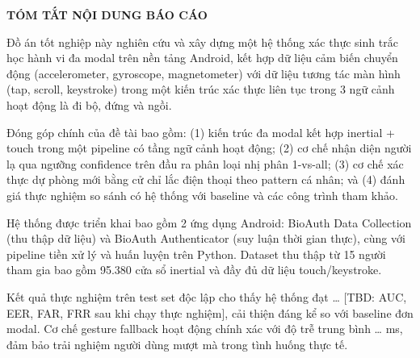 \documentclass[../DoAn.tex]{subfiles}
\begin{document}
    \begin{center}
        \Large{\textbf{TÓM TẮT NỘI DUNG BÁO CÁO}}\\
    \end{center}
    \vspace{1cm}

    Đồ án tốt nghiệp này nghiên cứu và xây dựng một hệ thống xác thực sinh trắc học hành vi đa modal trên nền tảng Android, kết hợp dữ liệu cảm biến chuyển động (accelerometer, gyroscope, magnetometer) với dữ liệu tương tác màn hình (tap, scroll, keystroke) trong một kiến trúc xác thực liên tục trong 3 ngữ cảnh hoạt động là đi bộ, đứng và ngồi. 
    
    Đóng góp chính của đề tài bao gồm: (1) kiến trúc đa modal kết hợp inertial + touch trong một pipeline có tầng ngữ cảnh hoạt động; (2) cơ chế nhận diện người lạ qua ngưỡng confidence trên đầu ra phân loại nhị phân 1-vs-all; (3) cơ chế xác thực dự phòng mới bằng cử chỉ lắc điện thoại theo pattern cá nhân; và (4) đánh giá thực nghiệm so sánh có hệ thống với baseline và các công trình tham khảo.
    
    Hệ thống được triển khai bao gồm 2 ứng dụng Android: BioAuth Data Collection (thu thập dữ liệu) và BioAuth Authenticator (suy luận thời gian thực), cùng với pipeline tiền xử lý và huấn luyện trên Python. Dataset thu thập từ 15 người tham gia bao gồm 95.380 cửa sổ inertial và đầy đủ dữ liệu touch/keystroke.
    
    Kết quả thực nghiệm trên test set độc lập cho thấy hệ thống đạt … [TBD: AUC, EER, FAR, FRR sau khi chạy thực nghiệm], cải thiện đáng kể so với baseline đơn modal. Cơ chế gesture fallback hoạt động chính xác với độ trễ trung bình … ms, đảm bảo trải nghiệm người dùng mượt mà trong tình huống thực tế.
\end{document}

